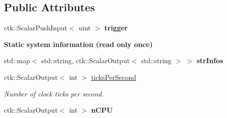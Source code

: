 \subsection*{Public Attributes}
\begin{DoxyCompactItemize}
\item 
ctk\+::\+Scalar\+Push\+Input$<$ uint $>$ {\bfseries trigger}
\end{DoxyCompactItemize}
\begin{Indent}{\bf Static system information (read only once)}\par
\begin{DoxyCompactItemize}
\item 
std\+::map$<$ std\+::string, ctk\+::\+Scalar\+Output$<$ std\+::string $>$ $>$ {\bfseries str\+Infos}\hypertarget{classSystemInfoModule_ae52c7cda303fc72110074058c7b549b1}{}\label{classSystemInfoModule_ae52c7cda303fc72110074058c7b549b1}

\item 
ctk\+::\+Scalar\+Output$<$ int $>$ \hyperlink{classSystemInfoModule_abd71a50e108b76a81fb644ad745582c5}{ticks\+Per\+Second}
\begin{DoxyCompactList}\small\item\em Number of clock ticks per second. \end{DoxyCompactList}\item 
ctk\+::\+Scalar\+Output$<$ int $>$ {\bfseries n\+C\+PU}
\end{DoxyCompactItemize}
\end{Indent}
